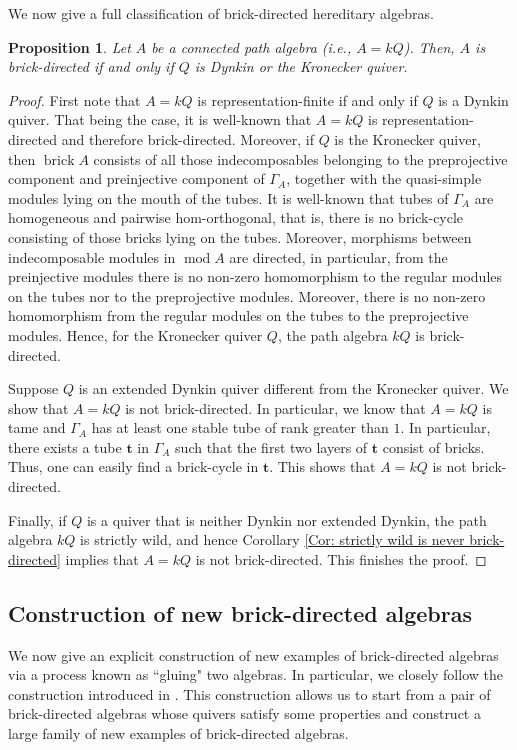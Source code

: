 \documentclass{amsart}
\theoremstyle{thmstyle}
\newtheorem{proposition}[thm]{Proposition}
\theoremstyle{exstyle}
\theoremstyle{defstyle}
\theoremstyle{remstyle}
\theoremstyle{remstyle}
\DeclareMathOperator*{\modu}{mod}
\DeclareMathOperator*{\brick}{brick}
\begin{document}
We now give a full classification of brick-directed hereditary algebras.

\begin{proposition}\label{Prop: Hereditary brick-directed algs}
Let $A$ be a connected path algebra (i.e., $A=kQ$). Then, $A$ is brick-directed if and only if $Q$ is Dynkin or the Kronecker quiver.
\end{proposition}
\begin{proof}
First note that $A=kQ$ is representation-finite if and only if $Q$ is a Dynkin quiver. That being the case, it is well-known that $A=kQ$ is representation-directed and therefore brick-directed. Moreover, if $Q$ is the Kronecker quiver, then $\brick A$ consists of all those indecomposables belonging to the preprojective component and preinjective component of $\Gamma_A$, together with the quasi-simple modules lying on the mouth of the tubes. It is well-known that tubes of $\Gamma_A$ are homogeneous and pairwise hom-orthogonal, that is, there is no brick-cycle consisting of those bricks lying on the tubes. Moreover, morphisms between indecomposable modules in $\modu A$ are directed, in particular, from the preinjective modules there is no non-zero homomorphism to the regular modules on the tubes nor to the preprojective modules. Moreover, there is no non-zero homomorphism from the regular modules on the tubes to the preprojective modules. Hence, for the Kronecker quiver $Q$, the path algebra $kQ$ is brick-directed. 

Suppose $Q$ is an extended Dynkin quiver different from the Kronecker quiver. We show that $A=kQ$ is not brick-directed. In particular, we know that $A=kQ$ is tame and $\Gamma_A$ has at least one stable tube of rank greater than $1$. In particular, there exists a tube $\mathbf{t}$ in $\Gamma_A$ such that the first two layers of $\mathbf{t}$ consist of bricks. Thus, one can easily find a brick-cycle in $\mathbf{t}$. This shows that $A=kQ$ is not brick-directed. 

Finally, if $Q$ is a quiver that is neither Dynkin nor extended Dynkin, the path algebra $kQ$ is strictly wild, and hence Corollary \ref{Cor: strictly wild is never brick-directed} implies that $A=kQ$ is not brick-directed. This finishes the proof.
\end{proof}


\subsection{Construction of new brick-directed algebras}\label{Subsection: Construction of new brick-directed algebras}
We now give an explicit construction of new examples of brick-directed algebras via a process known as ``gluing" two algebras. In particular, we closely follow the construction introduced in \cite[Section 7]{MP1}. This construction allows us to start from a pair of brick-directed algebras whose quivers satisfy some properties and construct a large family of new examples of brick-directed algebras.
\end{document}
